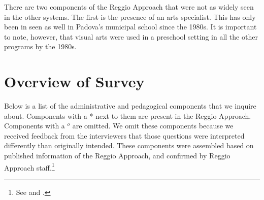 \documentclass[12pt]{article}
\begin{document}
There are two components of the Reggio Approach that were not as widely seen in the other systems. The first is the presence of an arts specialist. This has only been in seen as well in Padova's municipal school since the 1980s. It is important to note, however, that visual arts were used in a preschool setting in all the other programs by the 1980s.  

\section{Overview of Survey}
Below is a list of the administrative and pedagogical components that we inquire about. Components with a * next to them are present in the Reggio Approach. Components with a $^o$ are omitted. We omit these components because we received feedback from the interviewers that those questions were interpreted differently than originally intended. These components were assembled based on published information of the Reggio Approach, and confirmed by Reggio Approach staff.\footnote{See \citet{Edwards-etal-eds_1998_Hundred-Languages} and \citet{OECD_2001_Italy-Country-Note}.}
\end{document}
